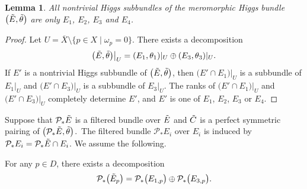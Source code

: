 \documentclass[10pt,a4paper]{amsart}
\numberwithin{equation}{section}
\newtheorem{Lemma}[Theorem]{Lemma}
\begin{document}
\begin{Lemma}
 All nontrivial Higgs subbundles of the meromorphic Higgs bundle $\bigl(\Tilde{E},\Tilde{\theta}\bigr)$ are only $E_1$, $E_2$, $E_3$ and $E_4$.
\end{Lemma}
\begin{proof}
 Let $U= \overline{X}\setminus \{p\in X\mid \omega_p=0 \}$. There exists a decomposition
 \begin{equation*}
 \bigl(\Tilde{E},\Tilde{\theta}\bigr)\big|_{U} = (E_1,\theta_1)|_{U}\oplus (E_3,\theta_3)|_{U}.
 \end{equation*}
 If $E'$ is a nontrivial Higgs subbundle of $\bigl(\Tilde{E},\Tilde{\theta}\bigr)$, then $\bigl(E'\cap E_1\bigr)|_{U}$ is a subbundle of $E_1|_{U}$ and $\bigl(E'\cap E_3\bigr)|_{U}$ is a subbundle of $E_3|_{U}$. The ranks of $\bigl(E'\cap E_1\bigr)|_{U}$ and $\bigl(E'\cap E_3\bigr)|_{U}$ completely determine $E'$, and $E'$ is one of $E_1$, $E_2$, $E_3$ or $E_4$.
\end{proof}

Suppose that $\mathcal{P}_*\Tilde{E}$ is a filtered bundle over $\Tilde{E}$ and $\Tilde{C}$ is a perfect symmetric pairing of $\bigl(\mathcal{P}_*\Tilde{E},\Tilde{\theta}\bigr)$.~The filtered bundle $\mathcal{P}_*E_i$ over $E_i$ is induced by $\mathcal{P}_*E_i = \mathcal{P}_*\Tilde{E} \cap E_i$. We assume the following.
\begin{Assumption}\label{assump}
 For any $p\in D$, there exists a decomposition
 \begin{equation*}
 \mathcal{P}_*\bigl(\Tilde{E}_p\bigr) = \mathcal{P}_*\bigl(E_{1,p}\bigr) \oplus \mathcal{P}_*\bigl(E_{3,p}\bigr).
 \end{equation*}
\end{Assumption}
\end{document}
